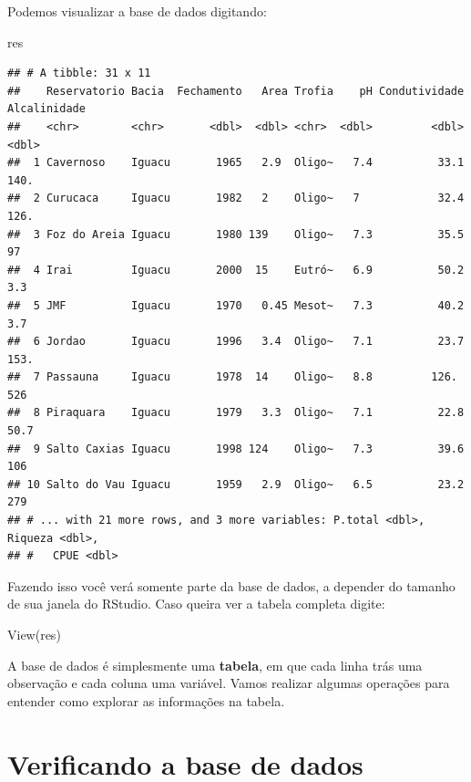\documentclass[
]{book}
\newenvironment{Shaded}{\begin{snugshade}}{\end{snugshade}}
\newcommand{\FunctionTok}[1]{\textcolor[rgb]{0.00,0.00,0.00}{#1}}
\newcommand{\NormalTok}[1]{#1}
\begin{document}
Podemos visualizar a base de dados digitando:

\begin{Shaded}
\begin{Highlighting}[]
\NormalTok{res}
\end{Highlighting}
\end{Shaded}

\begin{verbatim}
## # A tibble: 31 x 11
##    Reservatorio Bacia  Fechamento   Area Trofia    pH Condutividade Alcalinidade
##    <chr>        <chr>       <dbl>  <dbl> <chr>  <dbl>         <dbl>        <dbl>
##  1 Cavernoso    Iguacu       1965   2.9  Oligo~   7.4          33.1        140. 
##  2 Curucaca     Iguacu       1982   2    Oligo~   7            32.4        126. 
##  3 Foz do Areia Iguacu       1980 139    Oligo~   7.3          35.5         97  
##  4 Irai         Iguacu       2000  15    Eutró~   6.9          50.2          3.3
##  5 JMF          Iguacu       1970   0.45 Mesot~   7.3          40.2          3.7
##  6 Jordao       Iguacu       1996   3.4  Oligo~   7.1          23.7        153. 
##  7 Passauna     Iguacu       1978  14    Oligo~   8.8         126.         526  
##  8 Piraquara    Iguacu       1979   3.3  Oligo~   7.1          22.8         50.7
##  9 Salto Caxias Iguacu       1998 124    Oligo~   7.3          39.6        106  
## 10 Salto do Vau Iguacu       1959   2.9  Oligo~   6.5          23.2        279  
## # ... with 21 more rows, and 3 more variables: P.total <dbl>, Riqueza <dbl>,
## #   CPUE <dbl>
\end{verbatim}

Fazendo isso você verá somente parte da base de dados, a depender do tamanho de sua janela do RStudio. Caso queira ver a tabela completa digite:

\begin{Shaded}
\begin{Highlighting}[]
\FunctionTok{View}\NormalTok{(res)}
\end{Highlighting}
\end{Shaded}

A base de dados é simplesmente uma \textbf{tabela}, em que cada linha trás uma observação e cada coluna uma variável. Vamos realizar algumas operações para entender como explorar as informações na tabela.

\hypertarget{verificando-a-base-de-dados}{%
\section{Verificando a base de dados}\label{verificando-a-base-de-dados}}
\end{document}
